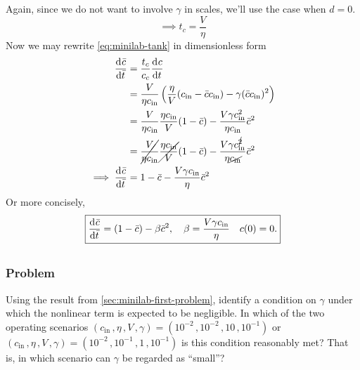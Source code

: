 \documentclass[12pt,twoside]{article}
\begin{document}
Again, since we do not want to involve $\gamma$ in scales, we'll use the case
when $d=0$.
\begin{equation*}
  \implies t_c = \frac{V}{\eta}
\end{equation*}
Now we may rewrite \cref{eq:minilab-tank} in dimensionless form
\begin{equation*}
  \begin{aligned}
    \frac{\mathrm{d}^{} {\bar{c}}}{\mathrm{d}{\bar{t}}^{}} &=
    \frac{t_c}{c_c}\frac{\mathrm{d}^{} {c}}{\mathrm{d}{t}^{}} \\
    &= \frac{V}{\eta c_{\text{in}}}
    \left(\frac{\eta}{V}(c_{\text{in}}-\bar{c}c_{\text{in}})-\gamma
    (\bar{c}c_{\text{in}})^2\right) \\
    &= \frac{V}{\eta c_{\text{in}}}\frac{\eta c_{\text{in}}}{V} (1-\bar{c}) -
    \frac{V\gamma c_{\text{in}}^2}{\eta c_{\text{in}}}\bar{c}^2 \\
    &= \cancel{\frac{V}{\eta c_{\text{in}}}} \cancel{\frac{\eta c_{\text{in}}}{V}}
    (1-\bar{c}) -
    \frac{V \gamma c_{\text{in}}^{\cancel{2}}}{\eta \cancel{c_{\text{in}}}}\bar{c}^2 \\
    \implies \frac{\mathrm{d}^{} {\bar{c}}}{\mathrm{d}{\bar{t}}^{}}
    &= 1-\bar{c} - \frac{V \gamma c_{\text{in}}}{\eta}\bar{c}^2 \\
  \end{aligned}
\end{equation*}
Or more concisely,
\begin{equation*} \boxed{
    \frac{\mathrm{d}^{} {\bar{c}}}{\mathrm{d}{\bar{t}}^{}} = (1 - \bar{c}) - \beta\bar{c}^2,
    \quad \beta = \frac{V \gamma c_{\text{in}}}{\eta} \quad c(0)=0.
    }
\end{equation*}

\subsection{}
\label{sec:minilab-second-problem}
\subsubsection*{Problem}
Using the result from \cref{sec:minilab-first-problem}, identify a condition on
$\gamma$ under which the nonlinear term is expected to be negligible. In which
of the two operating scenarios
$(c_{\text{in}}\,,\eta\,,V\,,\gamma) = (10^{-2}\,,10^{-2}\,,10\,,10^{-1})$ or
$(c_{\text{in}}\,,\eta\,,V\,,\gamma) = (10^{-2}\,,10^{-1}\,,1\,,10^{-1})$
is this condition reasonably met? That is, in which scenario can $\gamma$ be
regarded as ``small''?
\end{document}
